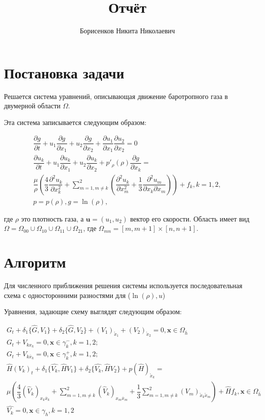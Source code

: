 \documentclass[12pt,a4paper]{article}
\author{Борисенков Никита Николаевич}
\title{Отчёт}
\date{}
\newcommand{\xo}{\mathring{x}}
\newcommand{\pd}[2]{\dfrac{\partial #1}{\partial #2}}
\begin{document}
\maketitle
\tableofcontents
\newpage
\section{Постановка задачи}

Решается система уравнений, описывающая движение баротропного газа в двумерной области $\Omega$.

Эта система записывается следующим образом:

\begin{gather*}
    \pd{g}{t} + u_1 \pd{g}{x_1} + u_2 \pd{g}{x_2} + \pd{u_1}{x_1} \pd{u_2}{x_2}= 0\\
    \pd{u_k}{t} + u_1 \pd{u_k}{x_1} + u_2 \pd{u_k}{x_2} + p'_{\rho}(\rho) \pd{g}{x_k} =\\
    \dfrac{\mu}{\rho}\left( \dfrac43 \pd{^2 u_k}{x_k^2} + \sum_{m = 1, m \neq k}^2 \left(  \pd{^2 u_k}{x_m^2} + \dfrac13  \pd{^2 u_m}{x_k \partial x_m} \right) \right) + f_k, k = 1,2,\\
    p = p(\rho), g = \ln(\rho),
\end{gather*}

где $\rho$ это плотность газа, а $\textbf{u} = (u_1, u_2)$ вектор его скорости.
Область имеет вид $\Omega = \Omega_{00} \cup \Omega_{10} \cup \Omega_{11} \cup \Omega_{21}$, где $\Omega_{mn} = [m, m+1] \times [n, n+1]$.

\section{Алгоритм}

Для численного приближения решения системы используется последовательная схема с односторонними разностями для ($\ln(\rho), u$)

Уравнения, задающие схему выглядят следующим образом:

\begin{gather*}
    G_t + \delta_1\{\hat{G},V_1\} + \delta_2\{\hat{G},V_2\} + (V_1)_{\xo_1} + (V_2)_{\xo_2} = 0,  \textbf{x} \in \Omega_{\overline{h}}\\
    G_t + V_{kx_k} = 0, \textbf{x} \in \gamma^{-}_k, k = 1, 2; \\
    G_t + V_{k\overline{x}_k} = 0, \textbf{x} \in \gamma^{+}_k, k = 1, 2; \\
    \hat{H}(V_k)_t + \delta_1\{ \hat{V_k}, \hat{H}V_1 \} + \delta_2\{ \hat{V_k}, \hat{H}V_2 \} + p(\hat{H})_{\xo_k} = \\
    \mu\left( \dfrac43 (\hat{V}_k)_{x_k \overline{x}_k} + \sum_{m = 1, m \neq k}^2 (\hat{V}_k)_{x_m \overline{x}_m} + \dfrac13 \sum_{m = 1, m \neq k}^2 (V_m)_{\xo_k \xo_m} \right) + \hat{H}f_k, \textbf{x} \in \Omega_{\overline{h}}\\
    \hat{V_k} = 0, \textbf{x} \in \gamma_h, k = 1, 2
\end{gather*}
\end{document}
